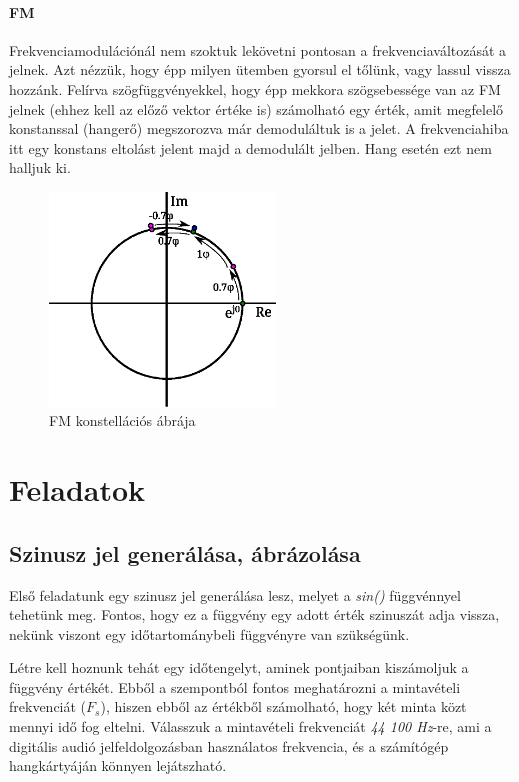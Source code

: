 \documentclass[12pt,a4paper]{article}
\begin{document}
\paragraph{FM}
Frekvenciamodulációnál nem szoktuk lekövetni pontosan a frekvenciaváltozását a jelnek. Azt nézzük, hogy épp milyen ütemben gyorsul el tőlünk, vagy lassul vissza hozzánk. Felírva szögfüggvényekkel, hogy épp mekkora szögsebessége van az FM jelnek (ehhez kell az előző vektor értéke is) számolható egy érték, amit megfelelő konstanssal (hangerő) megszorozva már demoduláltuk is a jelet. A frekvenciahiba itt egy konstans eltolást jelent majd a demodulált jelben. Hang esetén ezt nem halljuk ki.
\begin{figure}[H]
\begin{center}
\includegraphics[width=6cm]{figures/modulaciok_workshop_konst_fm_2.eps}
\caption{FM konstellációs ábrája}
\label{fig:konstfm}
\end{center}
\end{figure}

\clearpage
\section{Feladatok}

\subsection{Szinusz jel generálása, ábrázolása}
Első feladatunk egy szinusz jel generálása lesz, melyet a \textit{sin()} függvénnyel tehetünk meg. Fontos, hogy ez a függvény egy adott érték szinuszát adja vissza, nekünk viszont egy időtartománybeli függvényre van szükségünk. 

Létre kell hoznunk tehát egy időtengelyt, aminek pontjaiban kiszámoljuk a függvény értékét. Ebből a szempontból fontos meghatározni a mintavételi frekvenciát ($F_s$), hiszen ebből az értékből számolható, hogy két minta közt mennyi idő fog eltelni. Válasszuk a mintavételi frekvenciát \textit{44 100 Hz}-re, ami a digitális audió jelfeldolgozásban használatos frekvencia, és a számítógép hangkártyáján könnyen lejátszható.
\end{document}
